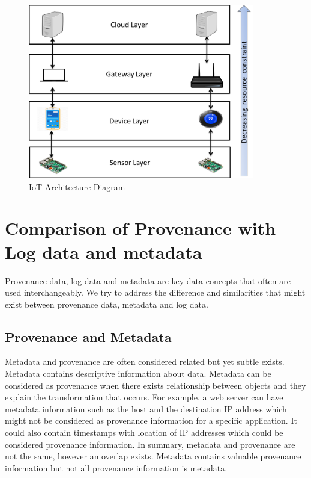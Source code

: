 \begin{figure}[h]
\begin{center}

\includegraphics[height=3.0in]{iot_architecture.png}
\end{center}
\caption{IoT Architecture Diagram}

\end{figure}



\section{Comparison of Provenance with Log data and metadata}

Provenance data, log data and metadata are key data concepts that often are used interchangeably. We try to address the difference and similarities that might exist between provenance data, metadata and log data.

\subsection{Provenance and Metadata}
Metadata and provenance are often considered related but yet subtle exists. Metadata contains descriptive information about data. Metadata can be considered as provenance when there exists relationship between objects and they explain the transformation that occurs. For example, a web server can have metadata information such as the host and the destination IP address which might not be considered as provenance information for a specific application. It could also contain timestamps with location of IP addresses which could be considered provenance information. In summary,  metadata and provenance are not the same, however an overlap exists. Metadata contains valuable  provenance information but not all provenance information is metadata. 


